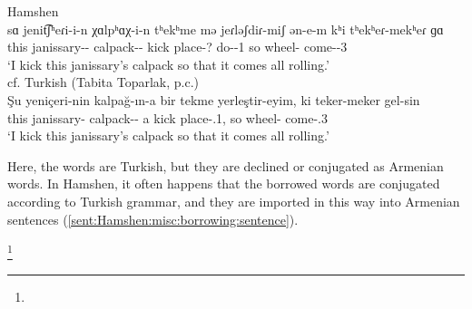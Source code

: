 \begin{exe}
	\ex \begin{xlist}
		\ex Hamshen \label{sent:Hamshen:misc:borrowing:sentenceBig} \\
		\gll sɑ jenit͡ʃʰeɾi-i-n χɑlpʰɑχ-i-n tʰekʰme mə jeɾləʃdiɾ-miʃ ən-e-m kʰi tʰekʰeɾ-mekʰeɾ ɡɑ \\ 
		this janissary-{\gen}-{} calpack-{\dat}-{} kick {\indf} place-? do-{\thgloss}-1{\sg} so wheel-{\echo} come-{\thgloss}-3{\sg}\\ 
		\trans `I kick this janissary's calpack so that it comes all rolling.' \\ 
		\ex cf. Turkish  (Tabita Toparlak, p.c.) \\
		\gll Şu yeniçeri-nin kalpağ-ın-a bir tekme yerleştir-eyim, ki teker-meker gel-sin \\ 
		this janissary-{\gen} calpack-{\poss}-{\dat} a kick place-{\opt}.1{\sg}, so wheel-{\echo} come-{\imp}.3{\sg} \\ 
		\trans `I kick this janissary's calpack so that it comes all rolling.' 
	\end{xlist}
\end{exe}



Here, the words are Turkish, but they are declined or conjugated as Armenian words. In Hamshen, it often happens that the borrowed words are conjugated according to Turkish grammar, and they are imported in this way into Armenian sentences (\ref{sent:Hamshen:misc:borrowing:sentence}).

 \footnote{}

